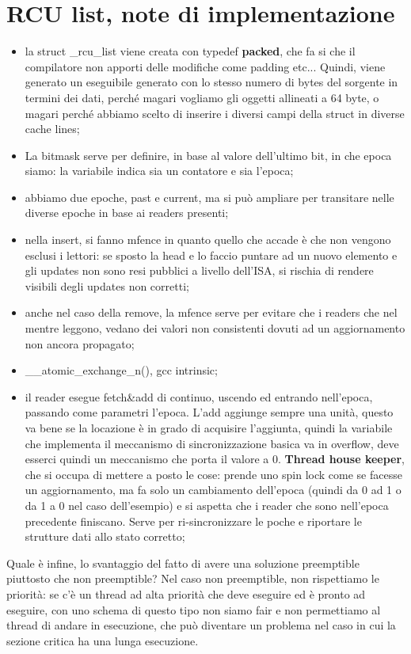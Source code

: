 \documentclass[12pt, oneside]{extbook}
\begin{document}
\section*{RCU list, note di implementazione}
\begin{itemize}
\item la struct \_rcu\_list viene creata con typedef \textbf{packed}, che fa si che il compilatore non apporti delle modifiche come padding etc... Quindi, viene generato un eseguibile generato con lo stesso numero di bytes del sorgente in termini dei dati, perché magari vogliamo gli oggetti allineati a 64 byte, o magari perché abbiamo scelto di inserire i diversi campi della struct in diverse cache lines;
\item La bitmask serve per definire, in base al valore dell'ultimo bit, in che epoca siamo: la variabile indica sia un contatore e sia l'epoca;
\item abbiamo due epoche, past e current, ma si può ampliare per transitare nelle diverse epoche in base ai readers presenti;
\item nella insert, si fanno mfence in quanto quello che accade è che non vengono esclusi i lettori: se sposto la head e lo faccio puntare ad un nuovo elemento e gli updates non sono resi pubblici a livello dell'ISA, si rischia di rendere visibili degli updates non corretti;
\item anche nel caso della remove, la mfence serve per evitare che i readers che nel mentre leggono, vedano dei valori non consistenti dovuti ad un aggiornamento non ancora propagato;
\item \_\_atomic\_exchange\_n(), gcc intrinsic;
\item il reader esegue fetch\&add di continuo, uscendo ed entrando nell'epoca, passando come parametri l'epoca. L'add aggiunge sempre una unità, questo va bene se la locazione è in grado di acquisire l'aggiunta, quindi la variabile che implementa il meccanismo di sincronizzazione basica va in overflow, deve esserci quindi un meccanismo che porta il valore a 0. \textbf{Thread house keeper}, che si occupa di mettere a posto le cose: prende uno spin lock come se facesse un aggiornamento, ma fa solo un cambiamento dell'epoca (quindi da 0 ad 1 o da 1 a 0 nel caso dell'esempio) e si aspetta che i reader che sono nell'epoca precedente finiscano. Serve per ri-sincronizzare le poche e riportare le strutture dati allo stato corretto;
\end{itemize}
Quale è infine, lo svantaggio del fatto di avere una soluzione preemptible piuttosto che non preemptible? Nel caso non preemptible, non rispettiamo le priorità: se c'è un thread ad alta priorità che deve eseguire ed è pronto ad eseguire, con uno schema di questo tipo non siamo fair e non permettiamo al thread di andare in esecuzione, che può diventare un problema nel caso in cui la sezione critica ha una lunga esecuzione.
\end{document}
